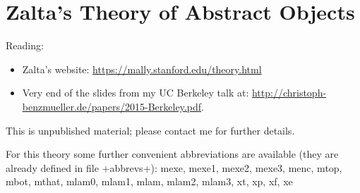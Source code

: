 \documentclass{article}
\begin{document}
\section{Zalta's Theory of Abstract Objects}
Reading:
\begin{itemize}
\item Zalta's website: \href{https://mally.stanford.edu/theory.html}{https://mally.stanford.edu/theory.html}
\item Very end of the slides from my  UC Berkeley talk at: %
  \href{http://christoph-benzmueller.de/papers/2015-Berkeley.pdf}{http://christoph-benzmueller.de/papers/2015-Berkeley.pdf}.
\end{itemize}

This is unpublished material; please contact me for further details.

For this theory some further convenient abbreviations are available
(they are already
defined in file +abbrevs+):  mexe, mexe1, mexe2, mexe3, menc, mtop, mbot, mthat, mlam0,
mlam1, mlam, mlam2, mlam3, xt, xp, xf, xe
\end{document}
